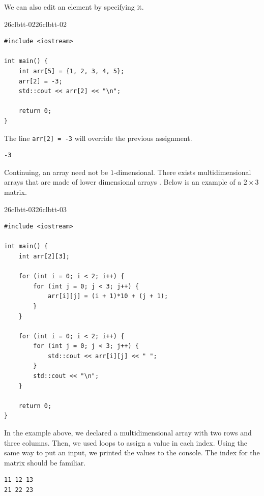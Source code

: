 \documentclass[../../../main.tex]{subfiles}
\begin{document}
We can also edit an element by specifying it.

\begin{cppbox}{26clbtt-02}{26clbtt-02}
\begin{lstlisting}[style=cppstyle]
#include <iostream>

int main() {
    int arr[5] = {1, 2, 3, 4, 5};
    arr[2] = -3;
    std::cout << arr[2] << "\n";

    return 0;
}
\end{lstlisting}
\end{cppbox}

The line \verb|arr[2] = -3| will override the previous assignment.

\begin{outputbox}
\begin{lstlisting}[style=basic]
-3
\end{lstlisting}
\end{outputbox}

Continuing, an array need not be $1$-dimensional. There exists
multidimensional arrays that are made of lower dimensional
arrays \cite{CS02-6}. Below is an example of a $2 \times 3$
matrix.

\begin{cppbox}{26clbtt-03}{26clbtt-03}
\begin{lstlisting}[style=cppstyle]
#include <iostream>

int main() {
    int arr[2][3];

    for (int i = 0; i < 2; i++) {
        for (int j = 0; j < 3; j++) {
            arr[i][j] = (i + 1)*10 + (j + 1);
        }
    }

    for (int i = 0; i < 2; i++) {
        for (int j = 0; j < 3; j++) {
            std::cout << arr[i][j] << " ";
        }
        std::cout << "\n";
    }

    return 0;
}
\end{lstlisting}
\end{cppbox}

In the example above, we declared a multidimensional array with
two rows and three columns. Then, we used loops to assign a value
in each index. Using the same way to put an input, we printed the
values to the console. The index for the matrix should be familiar.

\begin{outputbox}
\begin{lstlisting}[style=basic]
11 12 13
21 22 23
\end{lstlisting}
\end{outputbox}
\end{document}
